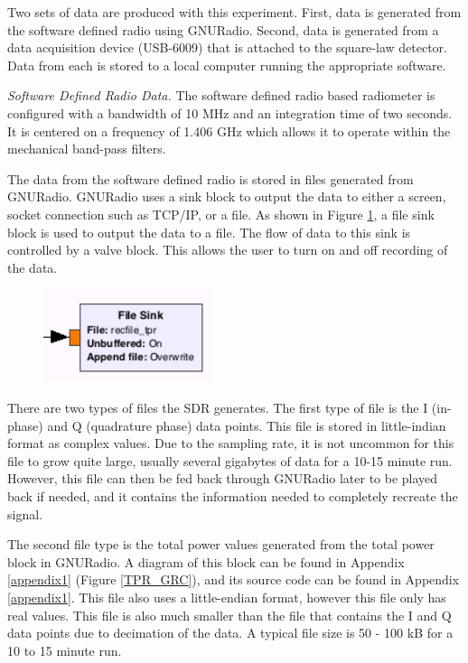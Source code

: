 Two sets of data are produced with this experiment.  First, data is generated from the software defined radio using GNURadio.  Second, data is generated from a data acquisition device (USB-6009) that is attached to the square-law detector.  Data from each is stored to a local computer running the appropriate software.

\emph{Software Defined Radio Data.}  The software defined radio based radiometer is configured with a bandwidth of 10 MHz and an integration time of two seconds.  It is centered on a frequency of 1.406 GHz which allows it to operate within the mechanical band-pass filters.

The data from the software defined radio is stored in files generated from GNURadio.  GNURadio uses a sink block to output the data to either a screen, socket connection such as TCP/IP, or a file.  As shown in Figure \ref{filesink}, a file sink block is used to output the data to a file.  The flow of data to this sink is controlled by a valve block.  This allows the user to turn on and off recording of the data.

{\begin{figure}[h!tb] \centering
\includegraphics[width=5cm]{Images/TPR_Filesink.png}
\label{filesink}
\end{figure}
}

There are two types of files the SDR generates.  The first type of file is the I (in-phase) and Q (quadrature phase) data points.  This file is stored in little-indian format as complex values.  Due to the sampling rate, it is not uncommon for this file to grow quite large, usually several gigabytes of data for a 10-15 minute run.  However, this file can then be fed back through GNURadio later to be played back if needed, and it contains the information needed to completely recreate the signal.

The second file type is the total power values generated from the total power block in GNURadio.  A diagram of this block can be found in Appendix \ref{appendix1} (Figure \ref{TPR_GRC}), and its source code can be found in Appendix \ref{appendix1}.  This file also uses a little-endian format, however this file only has real values.  This file is also much smaller than the file that contains the I and Q data points due to decimation of the data.  A typical file size is 50 - 100 kB for a 10 to 15 minute run.  

